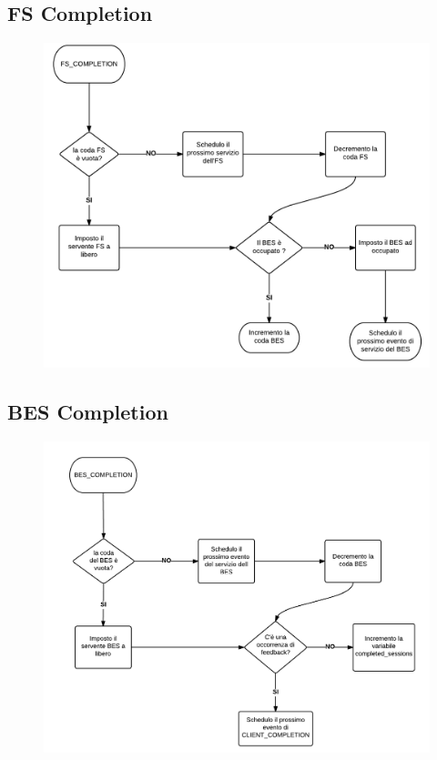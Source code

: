 \subsection{FS Completion}
\begin{figure}[H]
  \centering
  \includegraphics[scale=0.35]{img/FS_Completion.png}
  \label{fig:FS_Completion}
\end{figure}

\subsection{BES Completion}
\begin{figure}[H]
  \centering
  \includegraphics[scale=0.40]{img/BES_Completion.png}
  \label{fig:FS_Completion}
\end{figure}

